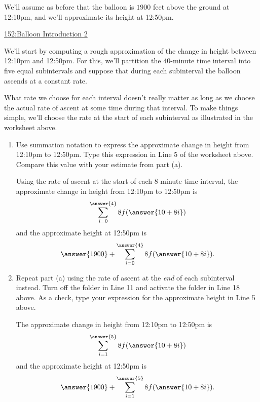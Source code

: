 \documentclass{ximera}
\begin{document}
\begin{example} \label{ExLKDrDEfRE9}

We'll assume as before that the balloon is $1900$ feet above the ground at 12:10pm, and we'll approximate its height at 12:50pm.

\begin{onlineOnly}
    \begin{center}
\end{center}
\end{onlineOnly}

\href{https://www.desmos.com/calculator/h6cworakdw}{152:Balloon Introduction 2}

We'll start by computing a rough approximation of the change in height between 12:10pm and 12:50pm. For this, we'll partition the $40$-minute time interval into five equal subintervals and suppose that during each subinterval the balloon ascends at a constant rate. 

What rate we choose for each interval doesn't really matter as long as we choose the actual rate of ascent at some time during that interval. To make things simple, we'll choose the rate at the start of each subinterval as illustrated in the worksheet above. 

\begin{enumerate}

\item Use summation notation to express the approximate change in height from 12:10pm to 12:50pm. Type this expression in Line 5 of the worksheet above. Compare this value with your estimate from part (a).

Using the rate of ascent at the start of each $8$-minute time interval, the approximate change in height from 12:10pm to 12:50pm is
\[
   \sum_{i=0}^{\answer{4}}8 f(\answer{10 + 8i})  
\]
and the approximate height at 12:50pm is
\[
     \answer{1900} + \sum_{i=0}^{\answer{4}}8 f(\answer{10 + 8i})  .
\]

\item Repeat part (a) using the rate of ascent at the \emph{end} of each subinterval instead. Turn off the folder in Line 11 and activate the folder in Line 18 above. As a check, type your expression for the approximate height in Line 5 above.

The approximate change in height from 12:10pm to 12:50pm is
\[
   \sum_{i=1}^{\answer{5}}8 f(\answer{10 + 8i})  
\]
and the approximate height at 12:50pm is
\[
     \answer{1900} + \sum_{i=1}^{\answer{5}} 8 f(\answer{10 + 8i})  .
\]


\end{enumerate}
\end{example}
\end{document}
